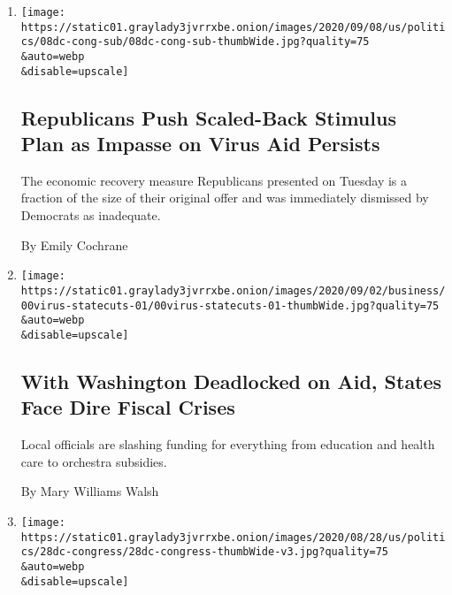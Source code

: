 \begin{enumerate}
\def\labelenumi{\arabic{enumi}.}
\item
  \href{/2020/09/08/us/politics/congress-coronavirus-stimulus.html}{}

  \texttt{[image: https://static01.graylady3jvrrxbe.onion/images/2020/09/08/us/politics/08dc-cong-sub/08dc-cong-sub-thumbWide.jpg?quality=75\\\&auto=webp\\\&disable=upscale]}

  \hypertarget{republicans-push-scaled-back-stimulus-plan-as-impasse-on-virus-aid-persists}{%
  \subsection{Republicans Push Scaled-Back Stimulus Plan as Impasse on
  Virus Aid
  Persists}\label{republicans-push-scaled-back-stimulus-plan-as-impasse-on-virus-aid-persists}}

  The economic recovery measure Republicans presented on Tuesday is a
  fraction of the size of their original offer and was immediately
  dismissed by Democrats as inadequate.

  By Emily Cochrane
\item
  \href{/2020/09/07/business/state-budgets-coronavirus-aid.html}{}

  \texttt{[image: https://static01.graylady3jvrrxbe.onion/images/2020/09/02/business/00virus-statecuts-01/00virus-statecuts-01-thumbWide.jpg?quality=75\\\&auto=webp\\\&disable=upscale]}

  \hypertarget{with-washington-deadlocked-on-aid-states-face-dire-fiscal-crises}{%
  \subsection{With Washington Deadlocked on Aid, States Face Dire Fiscal
  Crises}\label{with-washington-deadlocked-on-aid-states-face-dire-fiscal-crises}}

  Local officials are slashing funding for everything from education and
  health care to orchestra subsidies.

  By Mary Williams Walsh
\item
  \href{/2020/08/28/us/senate-control-republican-convention-trump.html}{}

  \texttt{[image: https://static01.graylady3jvrrxbe.onion/images/2020/08/28/us/politics/28dc-congress/28dc-congress-thumbWide-v3.jpg?quality=75\\\&auto=webp\\\&disable=upscale]}

  \hypertarget{crucial-battle-to-keep-senate-control-gets-little-notice-at-republican-convention}{%
}
\end{enumerate}
